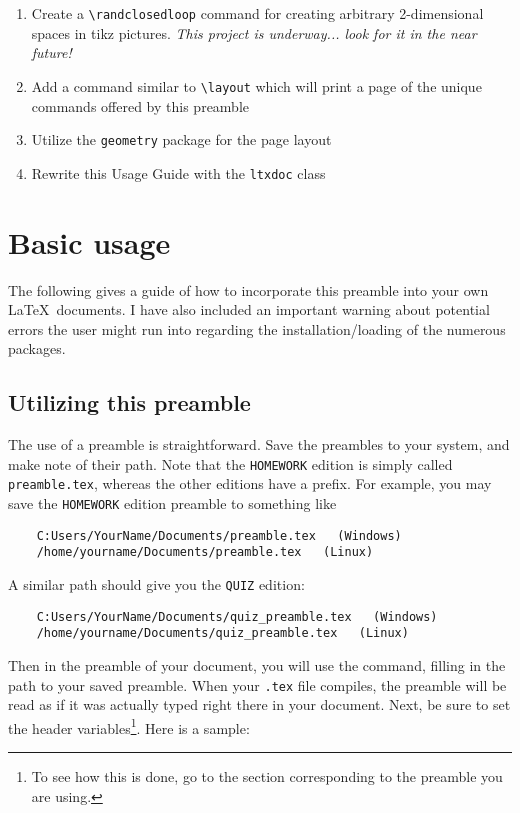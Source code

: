 \documentclass[letterpaper,12pt]{article}
\begin{document}
\begin{enumerate}[\bfseries I.]
	\item Create a \verb|\randclosedloop| command for creating arbitrary 2-dimensional spaces in tikz pictures. \textsl{This project is underway... look for it in the near future!}
	
	\item Add a command similar to \verb|\layout| which will print a page of 
	the unique commands offered by this preamble
	
	\item Utilize the \texttt{geometry} package for the page layout
	
	\item Rewrite this Usage Guide with the \texttt{ltxdoc} class
	
	\end{enumerate}

\section{Basic usage}
The following gives a guide of how to incorporate this preamble into your own \LaTeX\ documents. I have also included an important warning about potential errors the user might run into regarding the installation/loading of the numerous packages.

	\subsection{Utilizing this preamble}
	The use of a preamble is straightforward. Save the preambles to your system, and make note of their path. Note that the \texttt{HOMEWORK} edition is simply called \texttt{preamble.tex}, whereas the other editions have a prefix. For example, you may save the \texttt{HOMEWORK} edition preamble to something like
	
	\begin{verbatim}
	C:Users/YourName/Documents/preamble.tex   (Windows)
	/home/yourname/Documents/preamble.tex   (Linux)
	\end{verbatim}
	
	A similar path should give you the \texttt{QUIZ} edition:
	
	\begin{verbatim}
	C:Users/YourName/Documents/quiz_preamble.tex   (Windows)
	/home/yourname/Documents/quiz_preamble.tex   (Linux)
	\end{verbatim}
	
	Then in the preamble of your document, you will use the \verb|| command, filling in the path to your saved preamble. When your \texttt{.tex} file compiles, the preamble will be read as if it was actually typed right there in your document. Next, be sure to set the header variables\footnote{To see how this is done, go to the section corresponding to the preamble you are using.}. Here is a sample:
	
\end{document}
